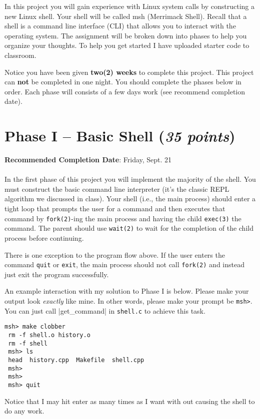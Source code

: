 \documentclass [12pt, letterpaper] {article}
\begin{document}
\progdirections
In this project you will gain experience with Linux system calls by
constructing a new Linux shell. Your shell will be called msh (Merrimack
Shell). Recall that a shell is a command line interface (CLI) that allows
you to interact with the operating system.
The assignment will be broken down into phases to help you
organize your thoughts. To help you get started I have uploaded starter
code to classroom.

Notice you have been given \textbf{two(2) weeks} to complete this
project. This project can \textbf{not} be completed in one night.
You should complete the phases below in order. Each phase will consists
of a few days work (see recommend completion date).

\section*{Phase I -- Basic Shell (\emph{35 points})}
\noindent\textbf{Recommended Completion Date}: Friday, Sept. 21\\
\\
In the first phase of this project you will implement the majority of the
shell. You must construct the basic command line interpreter (it's the classic REPL algorithm
we discussed in class). Your shell
(i.e., the main process) should enter a tight loop that prompts the user
for a command and then executes that command by {\tt fork(2)}-ing the main
process and having the child {\tt exec(3)} the command. The parent should
use {\tt wait(2)} to wait for the completion of the child process before
continuing.

There is one exception to the program flow above. If the user enters the
command {\tt quit} or {\tt exit}, the main process should not call {\tt fork(2)} and
instead just exit the program successfully.

An example interaction with my solution to Phase I is below. Please make
your output look \emph{exactly} like mine. In other words, please make
your prompt be {\tt msh>}. You can just call \statement|get_command| in
\texttt{shell.c} to achieve this task.

\begin{Verbatim}[frame=single]
 msh> make clobber
 rm -f shell.o history.o
 rm -f shell
 msh> ls
 head  history.cpp  Makefile  shell.cpp
 msh>
 msh>
 msh> quit
\end{Verbatim}
Notice that I may hit enter as many times as I want with out causing the
shell to do any work.
\end{document}
